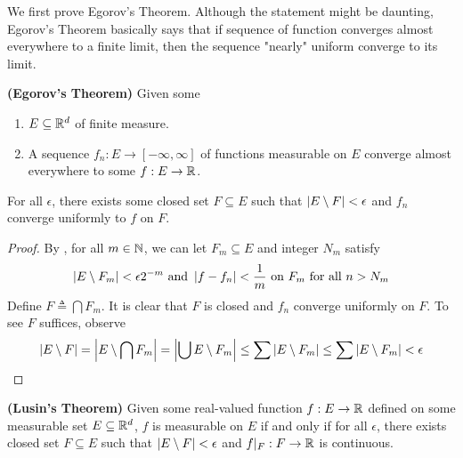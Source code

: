 \documentclass{report}
\begin{document}
\begin{mdframed}
We first prove Egorov's Theorem. Although the statement might be daunting, Egorov's Theorem basically says that if sequence of function converges almost everywhere to a finite limit, then the sequence "nearly" uniform converge to its limit. 
\end{mdframed}
\begin{theorem}
\label{Egorov's Theorem}
\textbf{(Egorov's Theorem)} Given some 
\begin{enumerate}[label=(\alph*)]
  \item $E\subseteq \mathbb{R}^d$ of finite measure. 
  \item A sequence $f_n:E\rightarrow [-\infty,\infty]$ of functions measurable on $E$ converge almost everywhere to some  $f:E\rightarrow \mathbb{R}$. 
\end{enumerate}
For all $\epsilon $, there exists some closed set $F\subseteq E$ such that $\left|E\setminus F\right|<\epsilon $ and $f_n$ converge uniformly to  $f$ on  $F$.  
\end{theorem}
\begin{proof}
By , for all $m \in\mathbb{N}$, we can let $F_m\subseteq E$ and integer $N_m$ satisfy 
 \begin{align*}
\left|E\setminus F_m\right|< \epsilon 2^{-m}\text{ and }\left|f-f_n\right|<\frac{1}{m}\text{ on }F_m\text{ for all }n>N_m
\end{align*}
Define $F\triangleq \bigcap F_m$. It is clear that $F$ is closed and  $f_n$ converge uniformly on  $F$. To see $F$ suffices, observe 
\begin{align*}
\left|E\setminus F\right|=\left|E\setminus \bigcap F_m\right|= \left|\bigcup E\setminus F_m\right|\leq \sum \left|E\setminus F_m\right|\leq  \sum \left|E\setminus F_m\right|<\epsilon 
\end{align*}
\end{proof}
\begin{theorem}
\textbf{(Lusin's Theorem)} Given some real-valued function $f:E\rightarrow \mathbb{R}$ defined on some measurable set $E\subseteq \mathbb{R}^d$, $f$ is measurable on  $E$ if and only if for all  $\epsilon $, there exists closed set $F\subseteq E$ such that $\left|E\setminus F\right|<\epsilon $ and $f|_F:F\rightarrow \mathbb{R}$ is continuous. 
\end{theorem}
\end{document}
